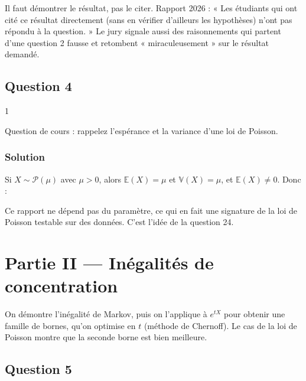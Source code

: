 \documentclass[11pt,a4paper]{article}
\newcommand{\equationajustee}[1]{%
  \sbox{\boiteequation}{$\displaystyle #1$}%
  \ifdim\wd\boiteequation>\linewidth
    \[\resizebox{\linewidth}{!}{\usebox{\boiteequation}}\]%
  \else
    \[#1\]%
  \fi}
\begin{document}
\begin{jury}

Il faut démontrer le résultat, pas le citer. Rapport 2026 : « Les étudiants qui ont cité ce résultat directement (sans en vérifier d'ailleurs les hypothèses) n'ont pas répondu à la question. » Le jury signale aussi des raisonnements qui partent d'une question 2 fausse et retombent « miraculeusement » sur le résultat demandé.

\end{jury}

\hypertarget{question-4}{%
\subsection{Question 4}\label{question-4}}

\begin{indication}{1}

Question de cours : rappelez l'espérance et la variance d'une loi de Poisson.

\end{indication}

\hypertarget{solution-3}{%
\subsubsection{Solution}\label{solution-3}}

Si \(X\sim\mathcal P(\mu)\) avec \(\mu>0\), alors \(\mathbb E(X)=\mu\) et \(\mathbb V(X)=\mu\), et \(\mathbb E(X)\ne0\). Donc :

\equationajustee{\boxed{\frac{\mathbb V(X)}{\mathbb E(X)}=1.}}

Ce rapport ne dépend pas du paramètre, ce qui en fait une signature de la loi de Poisson testable sur des données. C'est l'idée de la question 24.

\hypertarget{partie-ii-inuxe9galituxe9s-de-concentration}{%
\section{Partie II --- Inégalités de concentration}\label{partie-ii-inuxe9galituxe9s-de-concentration}}

On démontre l'inégalité de Markov, puis on l'applique à \(e^{tX}\) pour obtenir une famille de bornes, qu'on optimise en \(t\) (méthode de Chernoff). Le cas de la loi de Poisson montre que la seconde borne est bien meilleure.

\hypertarget{question-5}{%
\subsection{Question 5}\label{question-5}}
\end{document}
